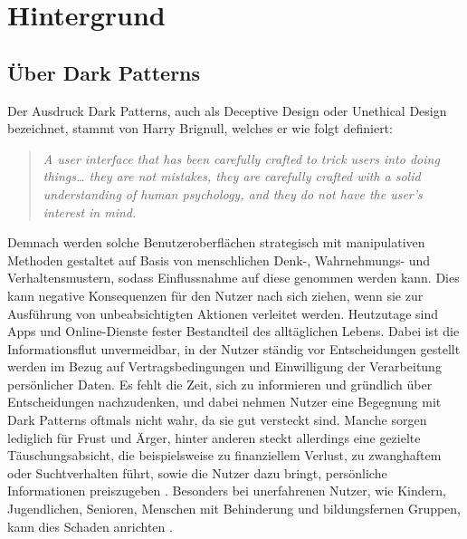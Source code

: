 \documentclass[a4paper]{article}
\begin{document}
\newpage

\section{Hintergrund}
\label{sec:hintergrund}

\subsection{Über Dark Patterns} 
\label{sub:die_hintergruende_der_dark_patterns}
Der Ausdruck Dark Patterns, auch als  \glqq Deceptive Design\grqq{} oder \glqq Unethical Design\grqq{} bezeichnet, stammt von Harry Brignull, welches er wie folgt definiert:
\begin{quote}
\glqq \textit{A user interface that has been carefully crafted to trick users into doing things… they are not mistakes, they are carefully crafted with a solid understanding of human psychology, and they do not have the user's interest in mind.}\grqq{}
\end{quote}
Demnach werden solche Benutzeroberflächen strategisch mit manipulativen Methoden gestaltet auf Basis von menschlichen Denk-, Wahrnehmungs- und Verhaltensmustern, sodass Einflussnahme auf diese genommen werden kann. Dies kann negative Konsequenzen für den Nutzer nach sich ziehen, wenn sie zur Ausführung von unbeabsichtigten Aktionen verleitet werden.\newline
Heutzutage sind Apps und Online-Dienste fester Bestandteil des alltäglichen Lebens. Dabei ist die Informationsflut unvermeidbar, in der Nutzer ständig vor Entscheidungen gestellt werden im Bezug auf Vertragsbedingungen und Einwilligung der Verarbeitung persönlicher Daten. Es fehlt die Zeit, sich zu informieren und gründlich über Entscheidungen nachzudenken, und dabei nehmen Nutzer eine Begegnung mit Dark Patterns oftmals nicht wahr, da sie gut versteckt sind. Manche sorgen lediglich für Frust und Ärger, hinter anderen steckt allerdings eine gezielte Täuschungsabsicht, die beispielsweise zu finanziellem Verlust, zu zwanghaftem oder Suchtverhalten führt, sowie die Nutzer dazu bringt, persönliche Informationen preiszugeben \cite{mathur}. Besonders bei unerfahrenen Nutzer, wie Kindern, Jugendlichen, Senioren, Menschen mit Behinderung und bildungsfernen Gruppen, kann dies Schaden anrichten \cite{tab}. \newline\newline
\end{document}
